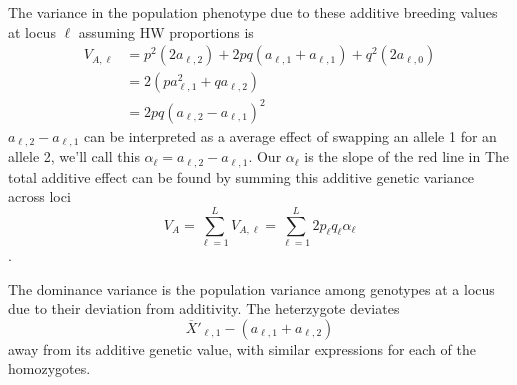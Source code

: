 The variance in the population phenotype due to these
additive breeding values at locus $\ell$ assuming HW proportions is
\begin{align}
V_{A, \ell} &= p^2 (2a_{\ell,2}) + 2pq (a_{\ell,1}+a_{\ell,1}) + q^2
(2a_{\ell,0}) \\
& = 2(p a_{\ell, 1} ^2 + q a_{\ell, 2} )\\
& = 2pq (a_{\ell, 2}-a_{\ell, 1})^2
\end{align}
$a_{\ell, 2}-a_{\ell, 1}$ can be interpreted as a average effect of
swapping an allele 1 for an allele 2, we'll call this
$\alpha_{\ell}=a_{\ell, 2}-a_{\ell, 1}$. Our $\alpha_{\ell}$ is the
slope of the red line in 
The total additive effect can
be found by summing this additive genetic variance across loci
\begin{equation}
V_A = \sum_{\ell=1}^{L} V_{A, \ell} = \sum_{\ell=1}^{L}
2p_{\ell}q_{\ell} \alpha_{\ell}
\end{equation}. 

The dominance variance is the population variance among
genotypes at a locus due to their deviation from additivity.
The heterzygote deviates 
\begin{equation}
\overline{X}'_{\ell,1}  - (a_{\ell,1}+ a_{\ell,2})
\end{equation}
away from its additive genetic value, with similar expressions for
each of the homozygotes. 
\newpage
